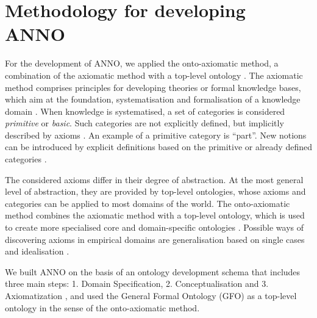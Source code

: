 \documentclass[sw]{iosart2x}
\begin{document}

\section{Methodology for developing ANNO}
For the development of ANNO, we applied the onto-axiomatic method, a combination of the axiomatic method with a top-level ontology \citep{baumann2014, herre2010}.
The axiomatic method comprises principles for developing theories or formal knowledge bases, which aim at the foundation, systematisation and formalisation of a knowledge domain \citep{baumann2014, herre2010}.
When knowledge is systematised, a set of categories is considered \emph{primitive} or \emph{basic}.
Such categories are not explicitly defined, but implicitly described by axioms \citep{Hilbert1918}.
An example of a primitive category is \enquote{part}.
New notions can be introduced by explicit definitions based on the primitive or already defined categories \citep{herre2010}.

The considered axioms differ in their degree of abstraction.
At the most general level of abstraction, they are provided by top-level ontologies, whose axioms and categories can be applied to most domains of the world.
The onto-axiomatic method combines the axiomatic method with a top-level ontology, which is used to create more specialised core and domain-specific ontologies \citep{baumann2014}.
Possible ways of discovering axioms in empirical domains are generalisation based on single cases and idealisation \citep{baumann2011}.

We built ANNO on the basis of an ontology development schema that includes three main steps: 1. Domain Specification, 2. Conceptualisation and 3. Axiomatization \citep{herre2010}, and used the General Formal Ontology (GFO) \citep{Loebe2022, Burek2020, herre2010} as a top-level ontology in the sense of the onto-axiomatic method.
\end{document}
